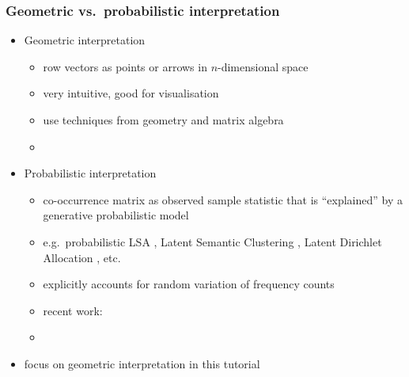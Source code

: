 \documentclass[t]{beamer} %
\begin{document}
\begin{frame}
  \frametitle{Geometric vs.\ probabilistic interpretation}

  \begin{itemize}
  \item Geometric interpretation
    \begin{itemize}
    \item row vectors as points or arrows in $n$-dimensional space
    \item very intuitive, good for visualisation
    \item use techniques from geometry and matrix algebra
    \item[]
    \end{itemize}
    \pause
  \item Probabilistic interpretation
    \begin{itemize}
    \item co-occurrence matrix as observed sample statistic that is ``explained'' by a generative probabilistic model
    \item e.g.\ probabilistic LSA \citep{Hoffmann:99}, Latent Semantic
      Clustering \citep{Rooth:etc:99}, Latent Dirichlet Allocation
      \citep{Blei:Ng:Jordan:03}, etc.
    \item explicitly accounts for random variation of frequency counts
    \item recent work: 
    \item[]
    \end{itemize}
    \pause
  \item[\hand] focus on geometric interpretation in this tutorial
  \end{itemize}
\end{frame}

\end{document}

